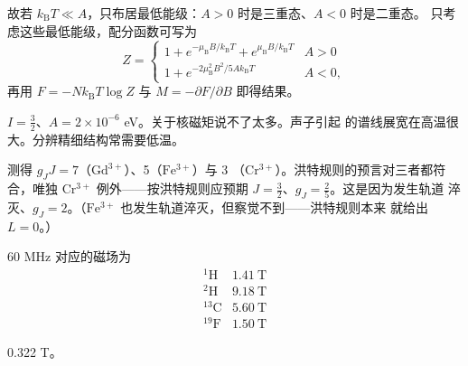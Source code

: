故若 $k_{\mathrm{B}}T\ll A$，只布居最低能级：$A>0$ 时是三重态、$A<0$ 时是二重态。
只考虑这些最低能级，配分函数可写为
\begin{equation*}
Z = \begin{cases} 1+e^{-\mu_{\mathrm{B}}B/k_{\mathrm{B}}T}+e^{\mu_{\mathrm{B}}B/k_{\mathrm{B}}T} & A>0\\ 1+e^{-2\mu_{\mathrm{B}}^{2}B^{2}/5Ak_{\mathrm{B}}T} & A<0, \end{cases}\tag{F.24}
\end{equation*}
再用 $F=-Nk_{\mathrm{B}}T\log Z$ 与 $M=-\partial F/\partial B$ 即得结果。

 $I=\frac{3}{2}$、$A=2\times10^{-6}$ eV。关于核磁矩说不了太多。声子引起
的谱线展宽在高温很大。分辨精细结构常需要低温。

 测得 $g_JJ=7$（$\mathrm{Gd^{3+}}$）、5（$\mathrm{Fe^{3+}}$）与 3
（$\mathrm{Cr^{3+}}$）。洪特规则的预言对三者都符合，唯独 $\mathrm{Cr^{3+}}$
例外——按洪特规则应预期 $J=\frac{3}{2}$、$g_J=\frac{2}{5}$。这是因为发生轨道
淬灭、$g_J=2$。（$\mathrm{Fe^{3+}}$ 也发生轨道淬灭，但察觉不到——洪特规则本来
就给出 $L=0$。）

 60 MHz 对应的磁场为
\begin{equation*}
\begin{array}{ll}
{}^{1}\mathrm{H} & 1.41\ \mathrm{T}\\
{}^{2}\mathrm{H} & 9.18\ \mathrm{T}\\
{}^{13}\mathrm{C} & 5.60\ \mathrm{T}\\
{}^{19}\mathrm{F} & 1.50\ \mathrm{T}
\end{array}
\end{equation*}

 0.322 T。

